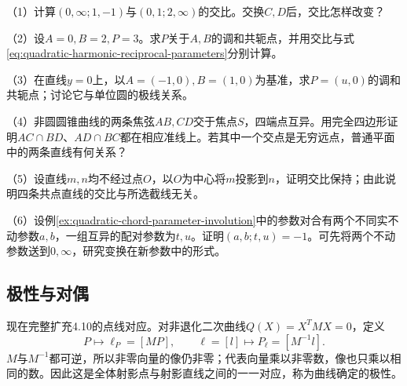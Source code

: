 \begin{exercise}
\mbox{}\par\nobreak
\begin{samepage}
（1）计算\((0,\infty;1,-1)\)与\((0,1;2,\infty)\)的交比。交换\(C,D\)后，交比怎样改变？
\par
\end{samepage}

\begin{samepage}
（2）设\(A=0,B=2,P=3\)。求\(P\)关于\(A,B\)的调和共轭点，并用交比与式\eqref{eq:quadratic-harmonic-reciprocal-parameters}分别计算。
\par
\end{samepage}

\begin{samepage}
（3）在直线\(y=0\)上，以\(A=(-1,0),B=(1,0)\)为基准，求\(P=(u,0)\)的调和共轭点；讨论它与单位圆的极线关系。
\par
\end{samepage}

\begin{samepage}
（4）非圆圆锥曲线的两条焦弦\(AB,CD\)交于焦点\(S\)，四端点互异。用完全四边形证明\(AC\cap BD\)、\(AD\cap BC\)都在相应准线上。若其中一个交点是无穷远点，普通平面中的两条直线有何关系？
\par
\end{samepage}

\begin{samepage}
（5）设直线\(m,n\)均不经过点\(O\)，以\(O\)为中心将\(m\)投影到\(n\)，证明交比保持；由此说明四条共点直线的交比与所选截线无关。
\par
\end{samepage}

\begin{samepage}
（6）设例\ref{ex:quadratic-chord-parameter-involution}中的参数对合有两个不同实不动参数\(a,b\)，一组互异的配对参数为\(t,u\)。证明\((a,b;t,u)=-1\)。可先将两个不动参数送到\(0,\infty\)，研究变换在新参数中的形式。
\par
\end{samepage}
\end{exercise}

\subsection{极性与对偶}
\label{subsec:quadratic-polarity-and-duality}

现在完整扩充4.10的点线对应。对非退化二次曲线\(Q(X)=X^TMX=0\)，定义
\begin{equation}\label{eq:quadratic-projective-polarity}
 P\longmapsto\ell_P=[MP],\qquad
 \ell=[l]\longmapsto P_\ell=[M^{-1}l].
\end{equation}
\(M\)与\(M^{-1}\)都可逆，所以非零向量的像仍非零；代表向量乘以非零数，像也只乘以相同的数。因此这是全体射影点与射影直线之间的一一对应，称为曲线确定的{\heiti{}极性}。


